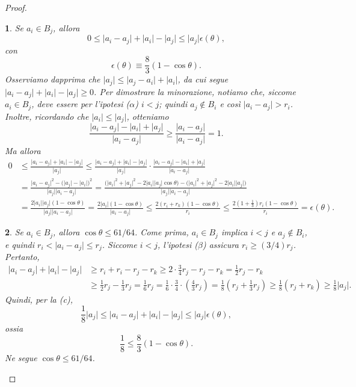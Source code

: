 \documentclass[a4paper,10pt,openright,oneside]{book}
\theoremstyle{theoremstyle}
\theoremstyle{theoremstylewoheader}
\theoremstyle{theoremstyle}
\theoremstyle{proofsecstyle}
\newtheorem{proofsec}{}
\theoremstyle{nonumberplain}
\newtheorem{proof}{Dim.}
\newcommand{\abs}[1]{\ensuremath{\lvert #1 \rvert}}
\begin{document}
\begin{proof}
\begin{proofsec}
\emph{Se $a_i \in B_j$, allora}
\[
0 \le \abs{a_i - a_j} + \abs{a_i} - \abs{a_j} \le \abs{a_j}\epsilon(\theta),
\]
\emph{con}
\[
\epsilon(\theta) \equiv \frac{8}{3}(1 - \cos\theta).
\]
Osserviamo dapprima che $\abs{a_j} \le \abs{a_j - a_i} + \abs{a_i}$, da cui segue $\abs{a_i - a_j} + \abs{a_i} - \abs{a_j} \ge 0$. Per dimostrare la minorazione, notiamo che, siccome $a_i \in B_j$, deve essere per l'ipotesi ($\alpha$) $i < j$; quindi $a_j \notin B_i$ e così $\abs{a_i - a_j} > r_i$. Inoltre, ricordando che $\abs{a_i} \le \abs{a_j}$, otteniamo
\[
\frac{\abs{a_i - a_j} - \abs{a_i} + \abs{a_j}}{\abs{a_i - a_j}} \ge \frac{\abs{a_i - a_j}}{\abs{a_i - a_j}} = 1.
\]
Ma allora
\begin{align*}
0 &\le \frac{\abs{a_i - a_j} + \abs{a_i} - \abs{a_j}}{\abs{a_j}} \le \frac{\abs{a_i - a_j} + \abs{a_i} - \abs{a_j}}{\abs{a_j}} \cdot \frac{\abs{a_i - a_j} - \abs{a_i} + \abs{a_j}}{\abs{a_i - a_j}}\\
&= \frac{\abs{a_i - a_j}^2 - \Big(\abs{a_j} - \abs{a_i}\Big)^2}{\abs{a_j}\abs{a_i - a_j}} = \frac{\Big(\abs{a_i}^2 + \abs{a_j}^2 - 2\abs{a_i}\abs{a_j}\cos\theta\Big) - \Big(\abs{a_i}^2 + \abs{a_j}^2 - 2\abs{a_i}\abs{a_j}\Big)}{\abs{a_j}\abs{a_i - a_j}}\\
&= \frac{2\abs{a_i}\abs{a_j}(1 - \cos\theta)}{\abs{a_j}\abs{a_i - a_j}} = \frac{2\abs{a_i}(1 - \cos\theta)}{\abs{a_i - a_j}} \le \frac{2(r_i + r_k)(1 - \cos\theta)}{r_i} \le \frac{2(1 + \frac{1}{3}) r_i (1 - \cos\theta)}{r_i} = \epsilon(\theta). 
\end{align*}
\end{proofsec}

\begin{proofsec}
\emph{Se $a_i \in B_j$, allora $\cos\theta \le 61/64$.}\hspace{.5em} Come prima, $a_i \in B_j$ implica $i < j$ e $a_j \notin B_i$, e quindi $r_i < \abs{a_i - a_j} \le r_j$. Siccome $i < j$, l'ipotesi ($\beta$) assicura $r_i \ge (3/4)r_j$.  Pertanto,
\begin{align*}
\abs{a_i - a_j} + \abs{a_i} - \abs{a_j} &\ge r_i + r_i - r_j - r_k \ge 2 \cdot \frac{3}{4}r_j - r_j - r_k = \frac{1}{2}r_j - r_k\\
&\ge \frac{1}{2}r_j - \frac{1}{3}r_j = \frac{1}{6}r_j = \frac{1}{6} \cdot \frac{3}{4} \cdot \left(\frac{4}{3} r_j\right) = \frac{1}{8} \left(r_j + \frac{1}{3}r_j\right) \ge \frac{1}{8}(r_j + r_k) \ge \frac{1}{8} \abs{a_j}.
\end{align*}
Quindi, per la (c),
\[
\frac{1}{8}\abs{a_j} \le \abs{a_i - a_j} + \abs{a_i} - \abs{a_j} \le \abs{a_j} \epsilon(\theta),
\]
ossia
\[
\frac{1}{8} \le \frac{8}{3}(1 - \cos\theta).
\]
Ne segue $\cos\theta \le 61/64$.
\end{proofsec}


\end{proof}
\end{document}
